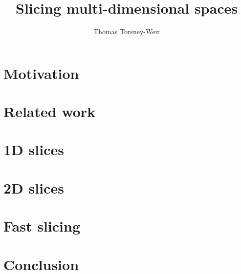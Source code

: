 \documentclass[a4paper,12pt]{memoir}
\title{Slicing multi-dimensional spaces}
\author{Thomas Torsney-Weir}
\date{}
\begin{document}
\DoubleSpacing

\maketitle

\listoffixmes

\tableofcontents

\chapter{Motivation}
\label{chp:motivation}


\chapter{Related work}


\chapter{1D slices}
\label{chp:sliceplorer}


\chapter{2D slices}
\label{chp:hypersliceplorer}


\chapter{Fast slicing}
\label{chp:rendering}


\chapter{Conclusion}
\label{chp:conclusion}




\end{document}
